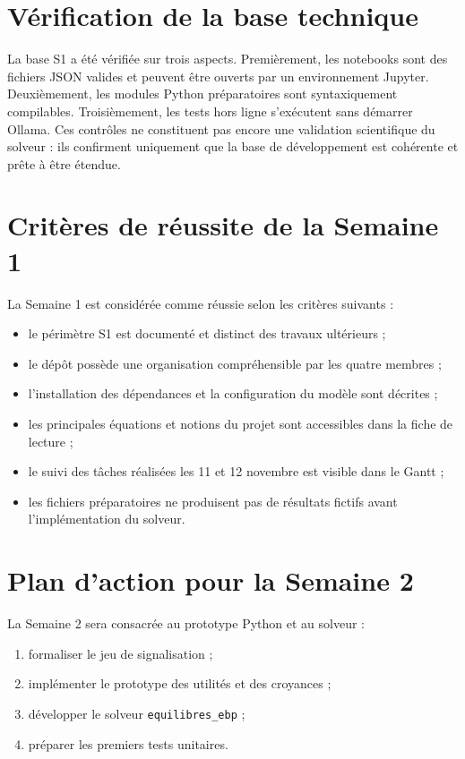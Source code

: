 \documentclass[11pt,a4paper]{article}
\begin{document}
\section{Vérification de la base technique}

La base S1 a été vérifiée sur trois aspects. Premièrement, les notebooks sont
des fichiers JSON valides et peuvent être ouverts par un environnement
Jupyter. Deuxièmement, les modules Python préparatoires sont syntaxiquement
compilables. Troisièmement, les tests hors ligne s'exécutent sans démarrer
Ollama. Ces contrôles ne constituent pas encore une validation scientifique
du solveur : ils confirment uniquement que la base de développement est
cohérente et prête à être étendue.

\section{Critères de réussite de la Semaine 1}

La Semaine 1 est considérée comme réussie selon les critères suivants :

\begin{itemize}
    \item le périmètre S1 est documenté et distinct des travaux ultérieurs ;
    \item le dépôt possède une organisation compréhensible par les quatre
    membres ;
    \item l'installation des dépendances et la configuration du modèle sont
    décrites ;
    \item les principales équations et notions du projet sont accessibles
    dans la fiche de lecture ;
    \item le suivi des tâches réalisées les 11 et 12 novembre est visible
    dans le Gantt ;
    \item les fichiers préparatoires ne produisent pas de résultats fictifs
    avant l'implémentation du solveur.
\end{itemize}

\section{Plan d'action pour la Semaine 2}

La Semaine 2 sera consacrée au prototype Python et au solveur :

\begin{enumerate}
    \item formaliser le jeu de signalisation ;
    \item implémenter le prototype des utilités et des croyances ;
    \item développer le solveur \texttt{equilibres\_ebp} ;
    \item préparer les premiers tests unitaires.
\end{enumerate}
\end{document}
